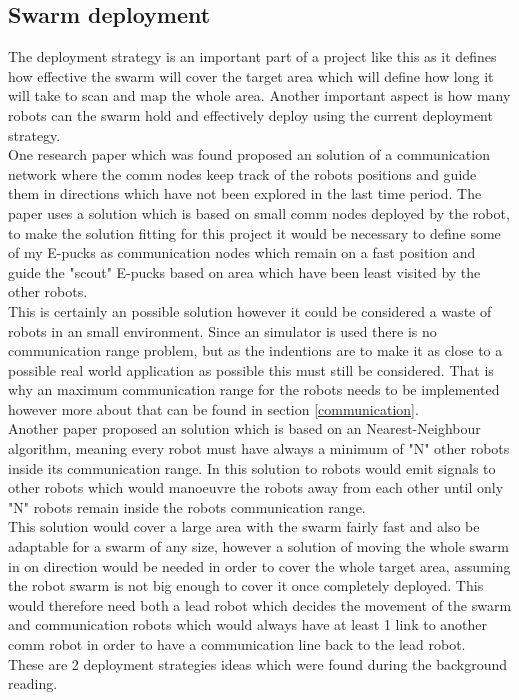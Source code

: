 \subsection{Swarm deployment}
The deployment strategy is an important part of a  project like this  as it defines how effective the swarm will cover the target area which will define how long it will take to scan and map the whole area. Another important aspect is how many robots can the swarm hold and effectively deploy using the current deployment strategy. \\ 
One research paper which was found proposed an solution of a communication network where the comm nodes keep track of the robots positions and guide them in directions which have not been explored in the last time period\cite{Batalin2003Coverage}. The paper uses a solution which is based on small comm nodes deployed by the robot, to make the solution fitting for this project it would be necessary to define some of my E-pucks as communication nodes which remain on a fast position and guide the "scout" E-pucks based on area which have been least visited by the other robots.\\ 
This is certainly an possible solution however it could be considered a waste of robots in an small environment. Since an simulator is used there is no communication range problem, but as the indentions are to make it as close to a possible real world application as possible this must still be considered. 
That is why an maximum communication range for the robots needs to be implemented however more about that can be found in section \ref{communication}.\\[3ex]

Another paper proposed an solution which is based on an Nearest-Neighbour algorithm, meaning every robot must have always a minimum of "N" other robots inside its communication range\cite{Poduri2004Constrained}. In this solution to robots would emit signals to other robots which would manoeuvre the robots away from each other until only "N" robots remain inside the robots communication range. \\
This solution would cover a large area with the swarm fairly fast and also be adaptable for a swarm of any size, however a solution of moving the whole swarm in on direction would be needed in order to cover the whole target area, assuming the robot swarm is not big enough to cover it once completely deployed.
This would therefore need both a lead robot which decides the movement of the swarm and communication robots which would always have at least 1 link to another comm robot in order to have a communication line back to the lead robot. \\
These are 2 deployment strategies ideas which were found during the background reading.  \\[3ex]

